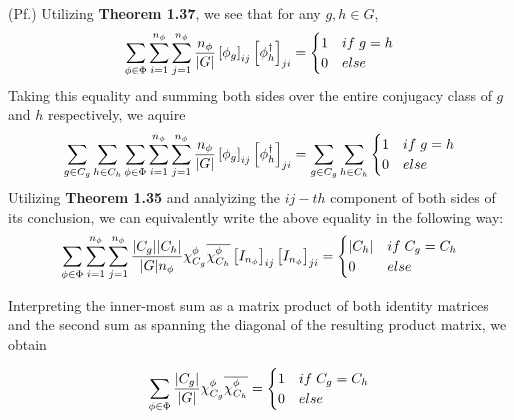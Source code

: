 \documentclass[10pt]{ucthesis}
\begin{document}
\noindent (Pf.) Utilizing \textbf{Theorem 1.37}, we see that for any $g, h \in G$, $$\sum_{\phi \in \Phi} \sum_{i=1}^{n_\phi} \sum_{j=1}^{n_\phi} \frac{n_\phi}{|G|} \left[\phi_g\right]_{ij}\left[\phi_{h}^\dag\right]_{ji} = \begin{cases}
																										1 & if \hspace{1mm} g = h \\
																										0 & else
																									\end{cases}$$
Taking this equality and summing both sides over the entire conjugacy class of $g$ and $h$ respectively, we aquire
\begin{equation}
	\begin{aligned}
		\sum_{g \in C_g} \sum_{h\in C_h} \sum_{\phi \in \Phi} \sum_{i=1}^{n_\phi} \sum_{j=1}^{n_\phi} \frac{n_\phi}{|G|} \left[\phi_g\right]_{ij}\left[\phi_{h}^\dag\right]_{ji} = \sum_{g \in C_g} \sum_{h\in C_h} \begin{cases}
																										1 & if \hspace{1mm} g = h \\
																										0 & else
																									\end{cases}
	\end{aligned}
\end{equation}
Utilizing \textbf{Theorem 1.35} and analyizing the $ij-th$ component of both sides of its conclusion, we can equivalently write the above equality in the following way:
\begin{equation}
	\begin{aligned}
		 \sum_{\phi \in \Phi} \sum_{i=1}^{n_\phi} \sum_{j=1}^{n_\phi} \frac{|C_g||C_h|}{|G|n_\phi}\chi^\phi_{C_g}\overline{\chi^\phi_{C_h}} \left[I_{n_\phi}\right]_{ij}\left[I_{n_\phi}\right]_{ji} = \begin{cases}
																										|C_h| & if \hspace{1mm} C_g = C_h \\
																										0 & else
																									\end{cases}
	\end{aligned}
\end{equation}

Interpreting the inner-most sum as a matrix product of both identity matrices and the second sum as spanning the diagonal of the resulting product matrix, we obtain

\begin{equation}
	\begin{aligned}
		 \sum_{\phi \in \Phi} \frac{|C_g|}{|G|}\chi^\phi_{C_g}\overline{\chi^\phi_{C_h}} = \begin{cases}
																										1 & if \hspace{1mm} C_g = C_h \\
																										0 & else
																									\end{cases}
	\end{aligned}
\end{equation}
\end{document}
